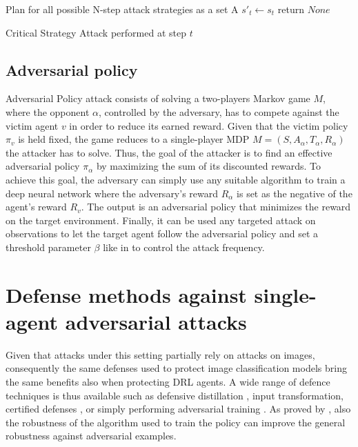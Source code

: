 \begin{algorithm}[H]
\SetAlgoLined
{}
Plan for all possible N-step attack strategies as a set A\;
$s'_t \leftarrow s_t$\;
return $None$\;
\caption{Critical Strategy Attack performed at step \(t\)}
\label{algo:csa}
\end{algorithm}

\subsection{Adversarial policy}
\label{sec:advpol}
Adversarial Policy attack consists of solving a two-players Markov game \(M\), where the opponent \(\alpha\), controlled by the adversary, has to compete against the victim agent \(v\) in order to reduce its earned reward. Given that the victim policy \(\pi_v\) is held fixed, the game reduces to a single-player MDP \(M=(S,A_\alpha,T_\alpha,R_\alpha)\) the attacker has to solve. Thus, the goal of the attacker is to find an effective adversarial policy \(\pi_\alpha\) by maximizing the sum of its discounted rewards. To achieve this goal, the adversary can simply use any suitable algorithm to train a deep neural network where the adversary’s reward \(R_\alpha\) is set as the negative of the agent’s reward \(R_v\). The output is an adversarial policy that minimizes the reward on the target environment. Finally, it can be used any targeted attack on observations to let the target agent follow the adversarial policy and set a threshold parameter \(\beta\) like in \cite{lin2017tactics} to control the attack frequency.

\section{Defense methods against single-agent adversarial attacks}
Given that attacks under this setting partially rely on attacks on images, consequently the same defenses used to protect image classification models bring the same benefits also when protecting DRL agents. A wide range of defence techniques is thus available such as defensive distillation \cite{papernot2015distillation}, input transformation, certified defenses \cite{oikarinen2020robust} \cite{fischer2019online} \cite{zhang2020robust}, or simply performing adversarial training \cite{goodfellow2014explaining}. As proved by \cite{s2017adversarial}, also the robustness of the algorithm used to train the policy can improve the general robustness against adversarial examples.

